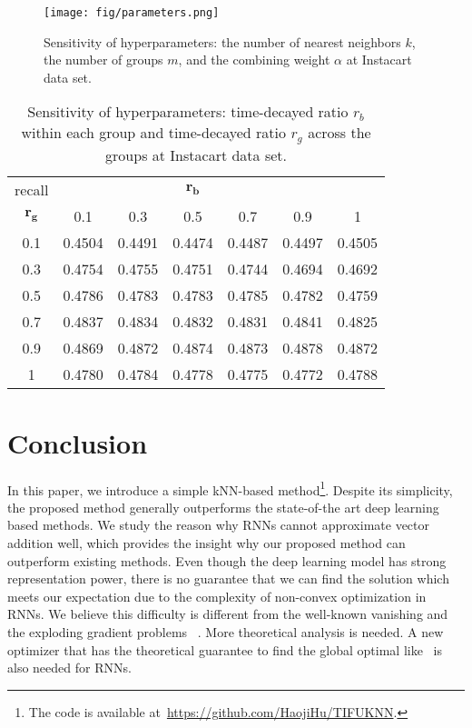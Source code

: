\documentclass[sigconf]{acmart}
\begin{document}
\begin{figure}[!t]
\centerline{\texttt{[image: fig/parameters.png]}}
\caption{Sensitivity of hyperparameters: the number of nearest neighbors $k$, the number of groups $m$, and the combining weight  $\alpha$ at Instacart data set.}
\label{fig:parameter}
\end{figure}

\begin{table}[ht]
\small
\caption{Sensitivity of hyperparameters: time-decayed ratio $r_b$ within each group and time-decayed ratio  $r_g$ across the groups at Instacart data set.}
\centering
\begin{tabular}{ccccccc}
\toprule 

recall&&&$\mathbf{r_b}$&&&\\
 $\mathbf{r_g}$&0.1&0.3&0.5&0.7&0.9&1\\
 \hline
 0.1&0.4504
    &0.4491
    &0.4474
    &0.4487	&0.4497
    &0.4505

\\
 0.3&0.4754
	&0.4755
	&0.4751
	&0.4744
	&0.4694
    &0.4692

\\
 0.5&0.4786
	&0.4783
	&0.4783
	&0.4785
	&0.4782
    &0.4759

\\
 0.7&0.4837
	&0.4834
	&0.4832
	&0.4831
	&0.4841
    &0.4825

\\
 0.9&0.4869
	&0.4872
	&0.4874
    &0.4873
	&0.4878
    &0.4872

\\
 1&0.4780
	&0.4784
	&0.4778
	&0.4775
	&0.4772
    &0.4788

\\
\bottomrule
\end{tabular}
\label{tab:param_sensitive}
\end{table}


\section{Conclusion}
\label{sec:conclusion}

In this paper, we introduce a simple kNN-based method\footnote{The code is available at~\url{https://github.com/HaojiHu/TIFUKNN}.}. Despite its simplicity, the proposed method generally outperforms the state-of-the art deep learning based methods.  We study the reason why RNNs cannot  approximate vector addition well, which provides the  insight why our proposed method can outperform existing methods. Even though the deep learning  model has strong representation  power, there is no guarantee that we can find the solution which meets our expectation due to the complexity of non-convex  optimization in RNNs. We believe this difficulty is  different from the  well-known  vanishing and the exploding gradient  problems  ~\cite{pascanu2013difficulty}.  More theoretical analysis is needed. A new optimizer that  has the theoretical  guarantee to find the global optimal like~\cite{wang2019learning} is also  needed for RNNs. 
\end{document}
